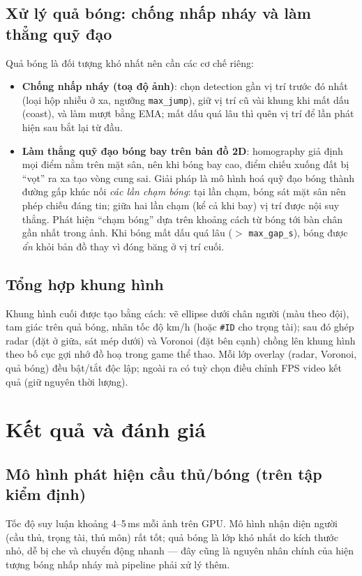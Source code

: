 \documentclass[12pt,a4paper]{article}
\begin{document}
\subsection{Xử lý quả bóng: chống nhấp nháy và làm thẳng quỹ đạo}
Quả bóng là đối tượng khó nhất nên cần các cơ chế riêng:
\begin{itemize}[leftmargin=1.4em]
  \item \textbf{Chống nhấp nháy (toạ độ ảnh)}: chọn detection gần vị trí trước đó nhất
        (loại hộp nhiễu ở xa, ngưỡng \texttt{max\_jump}), giữ vị trí cũ vài khung khi mất
        dấu (coast), và làm mượt bằng EMA; mất dấu quá lâu thì quên vị trí để lần phát
        hiện sau bắt lại từ đầu.
  \item \textbf{Làm thẳng quỹ đạo bóng bay trên bản đồ 2D}: homography giả định mọi điểm
        nằm trên mặt sân, nên khi bóng bay cao, điểm chiếu xuống đất bị ``vọt'' ra xa tạo
        vòng cung sai. Giải pháp là mô hình hoá quỹ đạo bóng thành đường gấp khúc nối
        \emph{các lần chạm bóng}: tại lần chạm, bóng sát mặt sân nên phép chiếu đáng tin;
        giữa hai lần chạm (kể cả khi bay) vị trí được nội suy thẳng. Phát hiện ``chạm
        bóng'' dựa trên khoảng cách từ bóng tới bàn chân gần nhất trong ảnh. Khi bóng mất
        dấu quá lâu ($>$ \texttt{max\_gap\_s}), bóng được \emph{ẩn} khỏi bản đồ thay vì
        đóng băng ở vị trí cuối.
\end{itemize}

\subsection{Tổng hợp khung hình}
Khung hình cuối được tạo bằng cách: vẽ ellipse dưới chân người (màu theo đội), tam giác
trên quả bóng, nhãn tốc độ km/h (hoặc \texttt{\#ID} cho trọng tài); sau đó ghép radar
(đặt ở giữa, sát mép dưới) và Voronoi (đặt bên cạnh) chồng lên khung hình theo bố cục gợi
nhớ đồ hoạ trong game thể thao. Mỗi lớp overlay (radar, Voronoi, quả bóng) đều bật/tắt
độc lập; ngoài ra có tuỳ chọn điều chỉnh FPS video kết quả (giữ nguyên thời lượng).

\section{Kết quả và đánh giá}

\subsection{Mô hình phát hiện cầu thủ/bóng (trên tập kiểm định)}
Tốc độ suy luận khoảng 4--5\,ms mỗi ảnh trên GPU. Mô hình nhận diện người (cầu thủ, trọng
tài, thủ môn) rất tốt; quả bóng là lớp khó nhất do kích thước nhỏ, dễ bị che và chuyển
động nhanh --- đây cũng là nguyên nhân chính của hiện tượng bóng nhấp nháy mà pipeline
phải xử lý thêm.
\end{document}
